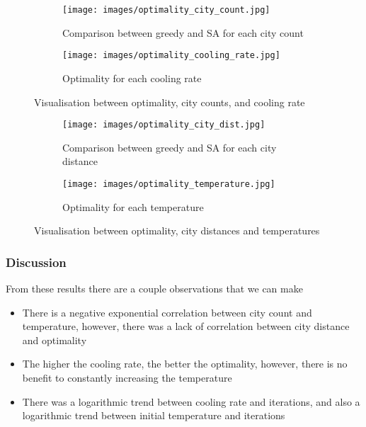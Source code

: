 \documentclass{article}
\begin{document}
\begin{figure}[H]
\centering
    \begin{subfigure}{0.45\textwidth}
        \centering
        \texttt{[image: images/optimality\_city\_count.jpg]}
        \caption{Comparison between greedy and SA for each city count}
        \label{fig:sub1}
    \end{subfigure}%
    \begin{subfigure}{0.45\textwidth}
        \centering
        \texttt{[image: images/optimality\_cooling\_rate.jpg]}
        \caption{Optimality for each cooling rate}
        \label{fig:sub2}
    \end{subfigure}
    \caption{Visualisation between optimality, city counts, and cooling rate}
\end{figure}


\begin{figure}[H]
\centering
    \begin{subfigure}{0.45\textwidth}
        \centering
        \texttt{[image: images/optimality\_city\_dist.jpg]}
        \caption{Comparison between greedy and SA for each city distance}
        \label{fig:sub1}
    \end{subfigure}%
    \begin{subfigure}{0.45\textwidth}
        \centering
        \texttt{[image: images/optimality\_temperature.jpg]}
        \caption{Optimality for each temperature}
        \label{fig:sub2}
    \end{subfigure}
    \caption{Visualisation between optimality, city distances and temperatures}
\end{figure}

\subsubsection{Discussion}

From these results there are a couple observations that we can make
\begin{itemize}
    \item There is a negative exponential correlation between city count and temperature, however, there was a lack of correlation between city distance and optimality
    \item The higher the cooling rate, the better the optimality, however, there is no benefit to constantly increasing the temperature
    \item There was a logarithmic trend between cooling rate and iterations, and also a logarithmic trend between initial temperature and iterations
\end{itemize}
\end{document}
